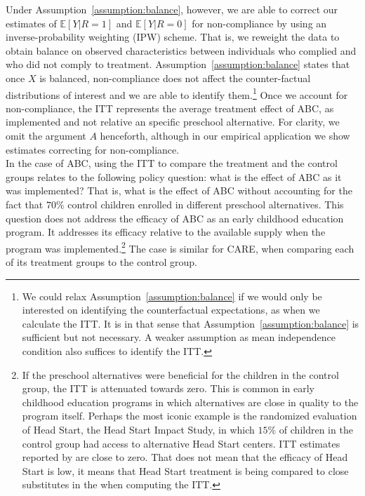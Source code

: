 \noindent Under Assumption~\ref{assumption:balance}, however, we are able to correct our estimates of $\mathbb{E} \left[ Y | R = 1 \right]$ and $\mathbb{E} \left[ Y | R = 0 \right]$ for non-compliance by using an inverse-probability weighting (IPW) scheme. That is, we reweight the data to obtain balance on observed characteristics between individuals who complied and who did not comply to treatment. Assumption~\ref{assumption:balance} states that once $X$ is balanced, non-compliance does not affect the counter-factual distributions of interest and we are able to identify them.\footnote{We could relax Assumption~\ref{assumption:balance} if we would only be interested on identifying the counterfactual expectations, as when we calculate the ITT. It is in that sense that Assumption~\ref{assumption:balance} is sufficient but not necessary. A weaker assumption as mean independence condition also suffices to identify the ITT.} Once we account for non-compliance, the ITT represents the average treatment effect of ABC, as implemented and not relative an specific preschool alternative. For clarity, we omit the argument $A$ henceforth, although in our empirical application we show estimates correcting for non-compliance.\\

\noindent In the case of ABC, using the ITT to compare the treatment and the control groups relates to the following policy question: what is the effect of ABC as it was implemented? That is, what is the effect of ABC without accounting for the fact that $70 \%$ control children enrolled in different preschool alternatives. This question does not address the efficacy of ABC as an early childhood education program. It addresses its efficacy relative to the available supply when the program was implemented.\footnote{If the preschool alternatives were beneficial for the children in the control group, the ITT is attenuated towards zero. This is common in early childhood education programs in which alternatives are close in quality to the program itself. Perhaps the most iconic example is the randomized evaluation of Head Start, the Head Start Impact Study, in which $15\%$ of children in the control group had access to alternative Head Start centers. ITT estimates reported by \cite{Puma_Bell_etal_2010_HeadStartImpact} are close to zero. That does not mean that the efficacy of Head Start is low, it means that Head Start treatment is being compared to close substitutes in the when computing the ITT.} The case is similar for CARE, when comparing each of its treatment groups to the control group.\\

